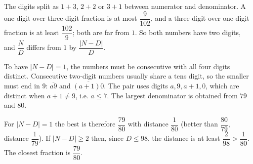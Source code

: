 The digits split as $1+3$, $2+2$ or $3+1$ between numerator and denominator. A one-digit over three-digit fraction is at most $\dfrac{9}{102}$, and a three-digit over one-digit fraction is at least $\dfrac{102}{9}$; both are far from $1$. So both numbers have two digits, and $\dfrac ND$ differs from $1$ by $\dfrac{|N-D|}{D}$.

To have $|N-D|=1$, the numbers must be consecutive with all four digits distinct. Consecutive two-digit numbers usually share a tens digit, so the smaller must end in $9$: $\overline{a9}$ and $\overline{(a+1)0}$. The pair uses digits $a,9,a+1,0$, which are distinct when $a+1\ne9$, i.e. $a\le7$. The largest denominator is obtained from $79$ and $80$.

For $|N-D|=1$ the best is therefore $\dfrac{79}{80}$ with distance $\dfrac{1}{80}$ (better than $\dfrac{80}{79}$, distance $\dfrac{1}{79}$). If $|N-D|\ge2$ then, since $D\le98$, the distance is at least $\dfrac{2}{98}>\dfrac{1}{80}$. The closest fraction is $\boxed{\dfrac{79}{80}}$.
